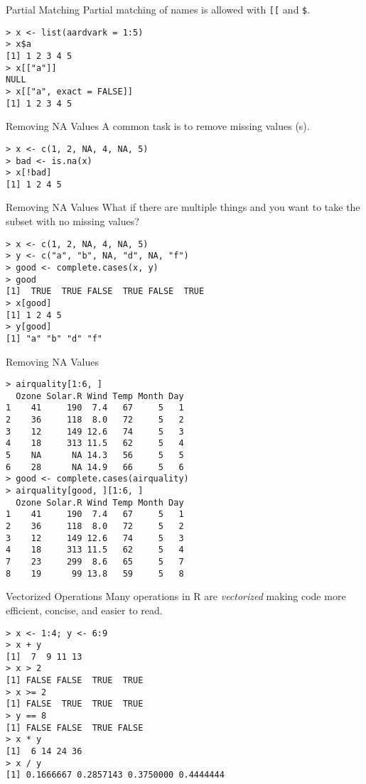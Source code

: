 \documentclass[aspectratio=169]{beamer}
\begin{document}
\begin{frame}[fragile]{Partial Matching}
Partial matching of names is allowed with \verb+[[+ and \verb+$+.
\begin{verbatim}
> x <- list(aardvark = 1:5)
> x$a
[1] 1 2 3 4 5
> x[["a"]]
NULL
> x[["a", exact = FALSE]]
[1] 1 2 3 4 5
\end{verbatim}
\end{frame}

\begin{frame}[fragile]{Removing NA Values}
A common task is to remove missing values (s).
\begin{verbatim}
> x <- c(1, 2, NA, 4, NA, 5)
> bad <- is.na(x)
> x[!bad]
[1] 1 2 4 5
\end{verbatim}
\end{frame}

\begin{frame}[fragile]{Removing NA Values}
What if there are multiple things and you want to take the subset with
no missing values?
\begin{verbatim}
> x <- c(1, 2, NA, 4, NA, 5)
> y <- c("a", "b", NA, "d", NA, "f")
> good <- complete.cases(x, y)
> good
[1]  TRUE  TRUE FALSE  TRUE FALSE  TRUE
> x[good]
[1] 1 2 4 5
> y[good]
[1] "a" "b" "d" "f"
\end{verbatim}
\end{frame}

\begin{frame}[fragile]{Removing NA Values}
\begin{verbatim}
> airquality[1:6, ]
  Ozone Solar.R Wind Temp Month Day
1    41     190  7.4   67     5   1
2    36     118  8.0   72     5   2
3    12     149 12.6   74     5   3
4    18     313 11.5   62     5   4
5    NA      NA 14.3   56     5   5
6    28      NA 14.9   66     5   6
> good <- complete.cases(airquality)
> airquality[good, ][1:6, ]
  Ozone Solar.R Wind Temp Month Day
1    41     190  7.4   67     5   1
2    36     118  8.0   72     5   2
3    12     149 12.6   74     5   3
4    18     313 11.5   62     5   4
7    23     299  8.6   65     5   7
8    19      99 13.8   59     5   8
\end{verbatim}
\end{frame}


\begin{frame}[fragile]{Vectorized Operations}
Many operations in R are \textit{vectorized} making code more
efficient, concise, and easier to read.
\begin{verbatim}
> x <- 1:4; y <- 6:9
> x + y
[1]  7  9 11 13
> x > 2
[1] FALSE FALSE  TRUE  TRUE
> x >= 2
[1] FALSE  TRUE  TRUE  TRUE
> y == 8
[1] FALSE FALSE  TRUE FALSE
> x * y
[1]  6 14 24 36
> x / y
[1] 0.1666667 0.2857143 0.3750000 0.4444444
\end{verbatim}
\end{frame}
\end{document}
